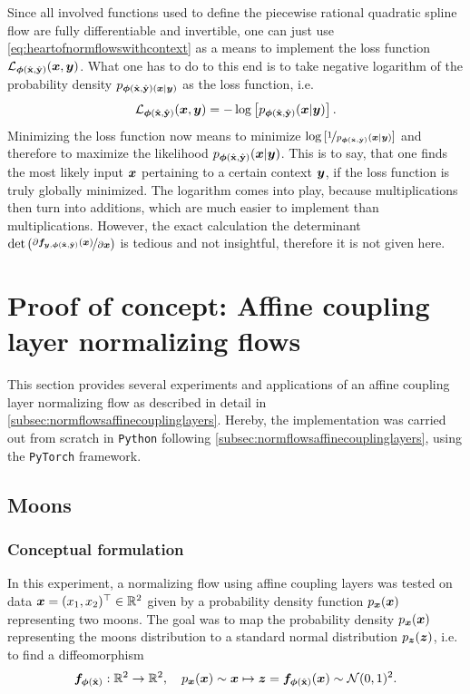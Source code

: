 \documentclass[a4paper,12pt]{report}
\begin{document}
Since all involved functions used to define the piecewise rational quadratic spline flow are fully differentiable and invertible, one can just use \cref{eq:heartofnormflowswithcontext} as a means to implement the loss function $\mathcal{L}_{\bm{\phi}(\hat{\boldsymbol{\mathbf{x}}},\hat{\boldsymbol{\mathbf{y}}})}(\bm{x},\bm{y})$. What one has to do to this end is to take negative logarithm of the probability density $p_{\bm{\phi}(\hat{\boldsymbol{\mathbf{x}}},\hat{\boldsymbol{\mathbf{y}}})(\bm{x}|\bm{y})}$ as the loss function, i.e. \begin{equation}
\mathcal{L}_{\bm{\phi}(\hat{\boldsymbol{\mathbf{x}}},\hat{\boldsymbol{\mathbf{y}}})}(\bm{x},\bm{y}) = -\log\left[p_{\bm{\phi}(\hat{\boldsymbol{\mathbf{x}}},\hat{\boldsymbol{\mathbf{y}}})}(\bm{x}|\bm{y})\right].
\end{equation} Minimizing the loss function now means to minimize $\log\left[\nicefrac{1 }{p_{\bm{\phi}(\hat{\boldsymbol{\mathbf{x}}},\hat{\boldsymbol{\mathbf{y}}})}(\bm{x}|\bm{y})}\right]$ and therefore to maximize the likelihood $p_{\bm{\phi}(\hat{\boldsymbol{\mathbf{x}}},\hat{\boldsymbol{\mathbf{y}}})}(\bm{x}|\bm{y})$. This is to say, that one finds the most likely input $\bm{x}$ pertaining to a certain context $\bm{y}$, if the loss function is truly globally minimized. The logarithm comes into play, because multiplications then turn into additions, which are much easier to implement than multiplications. However, the exact calculation the determinant $\det\left(\nicefrac{\partial \bm{f}_{\bm{y},\bm{\phi}(\hat{\boldsymbol{\mathbf{x}}},\hat{\boldsymbol{\mathbf{y}}})}(\bm{x})}{\partial \bm{x}}\right)$ is tedious and not insightful, therefore it is not given here.

\chapter{Proof of concept: Affine coupling layer normalizing flows}\label{chap:proofofconcept}
This section provides several experiments and applications of an affine coupling layer normalizing flow as described in detail in \cref{subsec:normflowsaffinecouplinglayers}. Hereby, the implementation was carried out from scratch in \verb|Python| following \cref{subsec:normflowsaffinecouplinglayers}, using the \verb|PyTorch| framework.

\section{Moons}
\subsection{Conceptual formulation}
In this experiment, a normalizing flow using affine coupling layers was tested on data $\bm{x}=(x_1,x_2)^\top \in \mathbb{R}^2$ given by a probability density function $p_{\bm{x}}(\bm{x})$ representing two moons. The goal was to map the probability density $p_{\bm{x}}(\bm{x})$ representing the moons distribution to a standard normal distribution $p_{\bm{z}}(\bm{z})$, i.e. to find a diffeomorphism
\begin{equation}
\bm{f}_{\bm{\phi}(\hat{\boldsymbol{\mathbf{x}}})}: \mathbb{R}^2\rightarrow \mathbb{R}^2, \quad p_{\bm{x}}(\bm{x}) \sim \bm{x} \mapsto \bm{z} = \bm{f}_{\bm{\phi}(\hat{\boldsymbol{\mathbf{x}}})}(\bm{x}) \sim \mathcal{N}(0,1)^2.
\end{equation}
\end{document}
